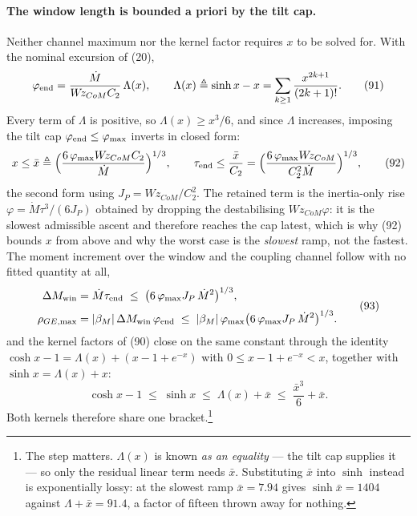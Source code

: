 \documentclass[10pt]{article}
\newcommand{\Wz}{W\!z_{CoM}}
\begin{document}
\paragraph{The window length is bounded a priori by the tilt cap.}
Neither channel maximum nor the kernel factor requires $x$ to be
solved for. With the nominal excursion of (20),
\begin{equation}
  \varphi_{\rm end} = \frac{\dot M}{\Wz C_2}\,\Lambda(x),
  \qquad \Lambda(x) \triangleq \sinh x - x
  = \sum_{k\ge1}\frac{x^{2k+1}}{(2k+1)!} .
  \tag{91}
\end{equation}
Every term of $\Lambda$ is positive, so $\Lambda(x)\ge x^3/6$, and
since $\Lambda$ increases, imposing the tilt cap
$\varphi_{\rm end}\le\varphi_{\max}$ inverts in closed form:
\begin{equation}
  x \le \bar x \triangleq
  \Bigl(\frac{6\,\varphi_{\max}\Wz C_2}{\dot M}\Bigr)^{1/3},
  \qquad
  \tau_{\rm end} \le \frac{\bar x}{C_2}
  = \Bigl(\frac{6\,\varphi_{\max}\Wz}{C_2^{2}\dot M}\Bigr)^{1/3},
  \tag{92}
\end{equation}
the second form using $J_P = \Wz/C_2^{2}$. The retained term is the
inertia-only rise $\varphi = \dot M\tau^3/(6J_P)$ obtained by dropping
the destabilising $\Wz\varphi$: it is the slowest admissible ascent and
therefore reaches the cap latest, which is why (92) bounds $x$ from
above and why the worst case is the \emph{slowest} ramp, not the
fastest. The moment increment over the window and the coupling channel
follow with no fitted quantity at all,
\begin{equation}
\begin{aligned}
  \Delta M_{\rm win} &= \dot M\tau_{\rm end}
  \;\le\; \bigl(6\,\varphi_{\max}J_P\,\dot M^{2}\bigr)^{1/3}, \\[2pt]
  \rho_{GE,\max} &= |\beta_M|\,\Delta M_{\rm win}\,\varphi_{\rm end}
  \;\le\; |\beta_M|\,\varphi_{\max}
          \bigl(6\,\varphi_{\max}J_P\,\dot M^{2}\bigr)^{1/3} .
\end{aligned}
  \tag{93}
\end{equation}
and the kernel factors of (90) close on the same constant through the
identity $\cosh x - 1 = \Lambda(x) + (x - 1 + e^{-x})$ with
$0\le x-1+e^{-x} < x$, together with $\sinh x = \Lambda(x) + x$:
\begin{equation}
  \cosh x - 1 \;\le\; \sinh x \;\le\; \Lambda(x) + \bar x
  \;\le\; \frac{\bar x^{3}}{6} + \bar x .
  \tag{94}
\end{equation}
Both kernels therefore share one bracket.\footnote{%
The step matters. $\Lambda(x)$ is known \emph{as an equality} --- the
tilt cap supplies it --- so only the residual linear term needs $\bar
x$. Substituting $\bar x$ into $\sinh$ instead is exponentially lossy:
at the slowest ramp $\bar x = 7.94$ gives $\sinh\bar x = 1404$ against
$\Lambda + \bar x = 91.4$, a factor of fifteen thrown away for
nothing.}
\end{document}
